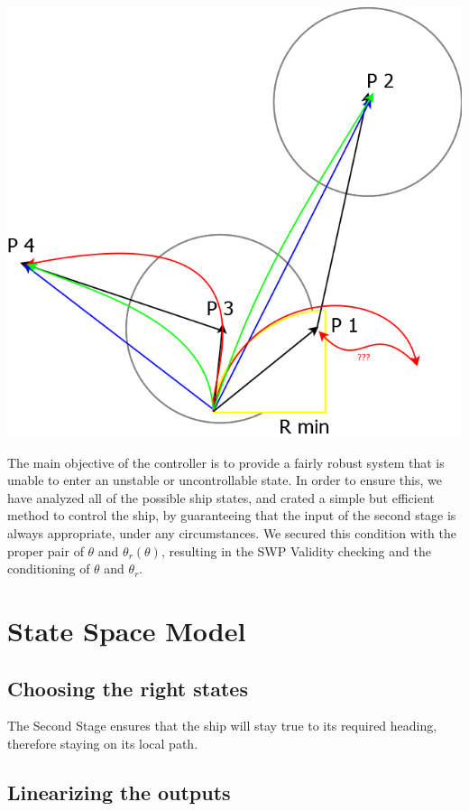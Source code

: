\includegraphics[width=\textwidth]{img/ControlStrategyFigures/SWP_Validity.png}

The main objective of the controller is to provide a fairly robust system that is unable to enter an unstable or uncontrollable state. In order to ensure this, we have analyzed all of the possible ship states, and crated a simple but efficient method to control the ship, by guaranteeing that the input of the second stage is always appropriate, under any circumstances. We secured this condition with the proper pair of $\theta$ and $\theta_r(\theta)$, resulting in the SWP Validity checking and the conditioning of $\theta$ and $\theta_r$.

\section{State Space Model}
\subsection{Choosing the right states}

The Second Stage ensures that the ship will stay true to its required heading, therefore staying on its local path.

\subsection{Linearizing the outputs}

